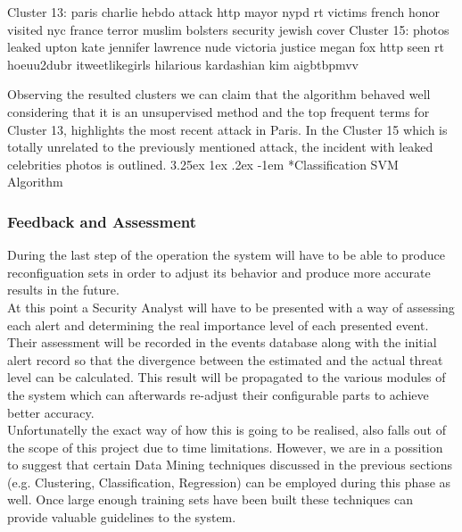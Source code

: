 \documentclass[12pt]{article}
\makeatletter
\renewcommand\paragraph{\@startsection{paragraph}{5}{\z@}%
  {3.25ex \@plus1ex \@minus.2ex}%
  {-1em}%
  {\normalfont\normalsize\bfseries}}
\makeatother
\begin{document}
\begin{spverbatim}
Cluster 13:  paris  charlie  hebdo  attack  http  mayor  nypd  
rt  victims  french  honor  visited  nyc  france  terror  muslim 
 bolsters  security  jewish  cover
Cluster 15:  photos  leaked  upton  kate  jennifer  lawrence 
 nude  victoria  justice  megan  fox  http  seen  rt  hoeuu2dubr  
itweetlikegirls  hilarious  kardashian  kim  aigbtbpmvv
\end{spverbatim}
\hfill \break
Observing the resulted clusters we can claim that the algorithm behaved well considering that it is an unsupervised method and the top frequent terms for Cluster 13, highlights the most recent attack in Paris. In the Cluster 15 which is totally unrelated to the previously mentioned attack, the incident with leaked celebrities photos is outlined.
\paragraph*{Classification}
SVM Algorithm 

\subsubsection{Feedback and Assessment}
During the last step of the operation the system will have to be able to produce reconfiguation sets in order to adjust its behavior and produce more accurate results in the future.
\hfill \break\\
At this point a Security Analyst will have to be presented with a way of assessing each alert and  determining the real importance level of each presented event.
\hfill \break\\
Their assessment will be recorded in the events database along with the initial alert record so that the divergence between the estimated and the actual threat level can be calculated. This result will be propagated to the various modules of the system which can afterwards re-adjust their configurable parts to achieve better accuracy.
\hfill \break\\
Unfortunatelly the exact way of how this is going to be realised, also falls out of the scope of this project due to time limitations. However, we are in a possition to suggest that certain Data Mining techniques discussed in the previous sections (e.g. Clustering, Classification, Regression) can be employed during this phase as well. Once large enough training sets have been built these techniques can provide valuable guidelines to the system. 
\end{document}
